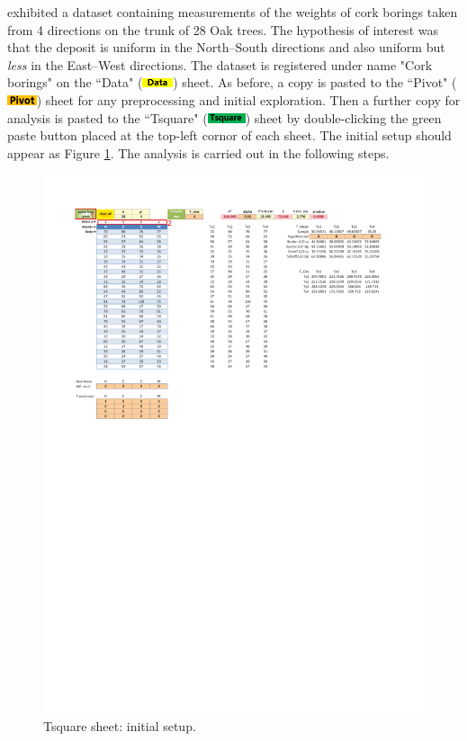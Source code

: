 \documentclass[article]{jss}
\numberwithin{equation}{subsection}
\newcommand{\shtData}{``Data" (\includegraphics[height=8pt, keepaspectratio=true]{DataSheetTab_png}) }
\newcommand{\shtPivot}{``Pivot" (\includegraphics[height=8pt, keepaspectratio=true]{PivotSheetTab_png}) }
\newcommand{\shtTsquare}{``Tsquare" (\includegraphics[height=8pt, keepaspectratio=true]{TsquareSheetTab_png}) }
\begin{document}
        \cite{rao1948corkboring} exhibited a dataset containing measurements of the weights of  cork borings taken from 4 directions on the trunk of 28 Oak trees. The hypothesis of interest was that the deposit is uniform in the North--South directions and also uniform but \emph{less} in the East--West directions. The dataset is registered under name "Cork borings" on the \shtData sheet. As before, a copy is pasted to the \shtPivot sheet for any preprocessing and initial exploration. Then a further copy for analysis is pasted to the \shtTsquare sheet by double-clicking the green paste button placed at the top-left cornor of each sheet. The initial setup should appear as Figure \ref{fig:corkboringinitialsetup}. The analysis is carried out in the following steps.
        \begin{figure}[!tbh]      
        	\includegraphics[width=\linewidth, keepaspectratio=true]{img/TsquareSheetAfterPaste_markup}
        	\vspace{-25pt}\centering{}\protect\caption{Tsquare sheet: initial setup.}\label{fig:corkboringinitialsetup}
        \end{figure}
\end{document}
